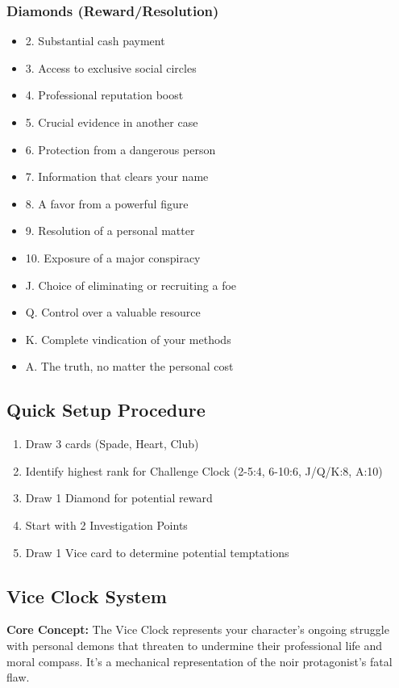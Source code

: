\documentclass[11pt]{article}
\begin{document}
\subsubsection{Diamonds (Reward/Resolution)}
\begin{itemize}
    \item 2. Substantial cash payment
    \item 3. Access to exclusive social circles
    \item 4. Professional reputation boost
    \item 5. Crucial evidence in another case
    \item 6. Protection from a dangerous person
    \item 7. Information that clears your name
    \item 8. A favor from a powerful figure
    \item 9. Resolution of a personal matter
    \item 10. Exposure of a major conspiracy
    \item J. Choice of eliminating or recruiting a foe
    \item Q. Control over a valuable resource
    \item K. Complete vindication of your methods
    \item A. The truth, no matter the personal cost
\end{itemize}

\subsection{Quick Setup Procedure}
\begin{enumerate}
    \item Draw 3 cards (Spade, Heart, Club)
    \item Identify highest rank for Challenge Clock (2-5:4, 6-10:6, J/Q/K:8, A:10)
    \item Draw 1 Diamond for potential reward
    \item Start with 2 Investigation Points
    \item Draw 1 Vice card to determine potential temptations
\end{enumerate}

\subsection{Vice Clock System}

\textbf{Core Concept:}
The Vice Clock represents your character's ongoing struggle with personal demons that threaten to undermine their professional life and moral compass. It's a mechanical representation of the noir protagonist's fatal flaw.
\end{document}
